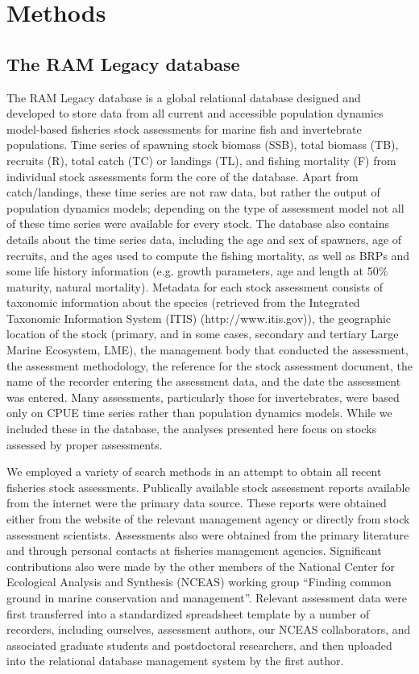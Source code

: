 \documentclass[letterpaper,12pt]{article}
\begin{document}
\newpage
\section*{Methods} 

\subsection*{The RAM Legacy database}
The RAM Legacy database is a global relational database designed and
developed to store data from all current and accessible population
dynamics model-based fisheries stock assessments for marine fish and
invertebrate populations. Time series of spawning stock biomass (SSB),
total biomass (TB), recruits (R), total catch (TC) or landings (TL),
and fishing mortality (F) from individual stock assessments form the
core of the database.  Apart from catch/landings, these time series
are not raw data, but rather the output of population dynamics models;
depending on the type of assessment model not all of these time series
were available for every stock. The database also contains details
about the time series data, including the age and sex of spawners, age
of recruits, and the ages used to compute the fishing mortality, as
well as BRPs and some life history information (e.g. growth
parameters, age and length at 50\% maturity, natural mortality).
Metadata for each stock assessment consists of taxonomic information
about the species (retrieved from the Integrated Taxonomic Information
System (ITIS) (http://www.itis.gov)), the geographic location of the
stock (primary, and in some cases, secondary and tertiary Large Marine
Ecosystem, LME), the management body that conducted the assessment,
the assessment methodology, the reference for the stock assessment
document, the name of the recorder entering the assessment data, and
the date the assessment was entered.  Many assessments, particularly
those for invertebrates, were based only on CPUE time series rather
than population dynamics models. While we included these in the
database, the analyses presented here focus on stocks assessed by
proper assessments.


We employed a variety of search methods in an attempt to obtain all
recent fisheries stock assessments.  Publically available stock
assessment reports available from the internet were the primary data
source.  These reports were obtained either from the website of the
relevant management agency or directly from stock assessment
scientists.  Assessments also were obtained from the primary
literature and through personal contacts at fisheries management
agencies.  Significant contributions also were made by the other members
of the National Center for Ecological Analysis and Synthesis (NCEAS)
working group ``Finding common ground in marine conservation and
management''. Relevant assessment data were first transferred into a
standardized spreadsheet template by a number of recorders, including
ourselves, assessment authors, our NCEAS collaborators, and associated
graduate students and postdoctoral researchers, and then uploaded into
the relational database management system by the first author.
\end{document}
